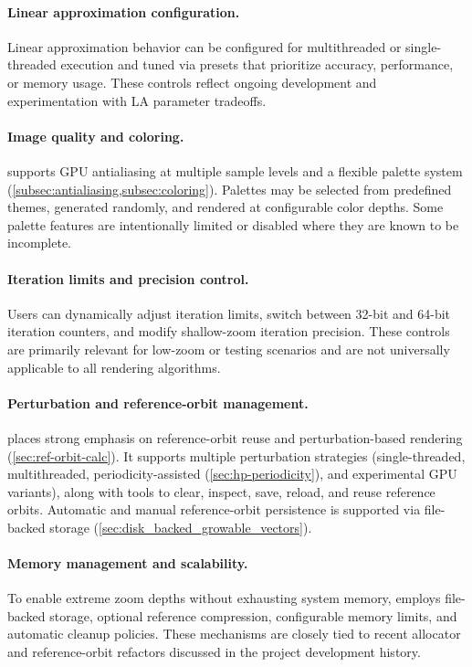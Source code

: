 \paragraph{Linear approximation configuration.}
Linear approximation behavior can be configured for multithreaded or
single-threaded execution and tuned via presets that prioritize accuracy,
performance, or memory usage.  These controls reflect ongoing development
and experimentation with LA parameter tradeoffs.

\paragraph{Image quality and coloring.}
\FractalShark{} supports GPU antialiasing at multiple sample levels and a
flexible palette system (\cref{subsec:antialiasing,subsec:coloring}).  Palettes may be selected from predefined themes,
generated randomly, and rendered at configurable color depths.  Some palette
features are intentionally limited or disabled where they are known to be
incomplete.

\paragraph{Iteration limits and precision control.}
Users can dynamically adjust iteration limits, switch between 32-bit and
64-bit iteration counters, and modify shallow-zoom iteration precision.
These controls are primarily relevant for low-zoom or testing scenarios and
are not universally applicable to all rendering algorithms.

\paragraph{Perturbation and reference-orbit management.}
\FractalShark{} places strong emphasis on reference-orbit reuse and
perturbation-based rendering (\cref{sec:ref-orbit-calc}).  It supports multiple perturbation strategies
(single-threaded, multithreaded, periodicity-assisted (\cref{sec:hp-periodicity}), and experimental GPU
variants), along with tools to clear, inspect, save, reload, and reuse
reference orbits.  Automatic and manual reference-orbit persistence is
supported via file-backed storage (\cref{sec:disk_backed_growable_vectors}).

\paragraph{Memory management and scalability.}
To enable extreme zoom depths without exhausting system memory, \FractalShark{}
employs file-backed storage, optional reference compression, configurable
memory limits, and automatic cleanup policies.  These mechanisms are closely
tied to recent allocator and reference-orbit refactors discussed in the
project development history.

